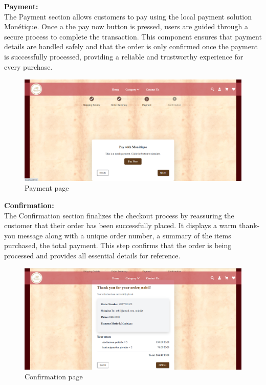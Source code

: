 \textbf{Payment:}\\

The Payment section allows customers to pay using the local payment solution Monétique. Once a the pay now button is pressed, users are guided through a secure process to complete the transaction. This component ensures that payment details are handled safely and that the order is only confirmed once the payment is successfully processed, providing a reliable and trustworthy experience for every purchase.

\begin{figure}[!h]
\begin{center}
\includegraphics{images/Payment page.png}
\end{center}
\caption{Payment page}
\end{figure}

\newpage
\textbf{Confirmation:}\\

The Confirmation section finalizes the checkout process by reassuring the customer that their order has been successfully placed. It displays a warm thank-you message along with a unique order number, a summary of the items purchased, the total payment. This step confirms that the order is being processed and provides all essential details for reference.

\begin{figure}[!h]
\begin{center}
\includegraphics{images/Confirmation page.png}
\end{center}
\caption{Confirmation page}
\end{figure}

